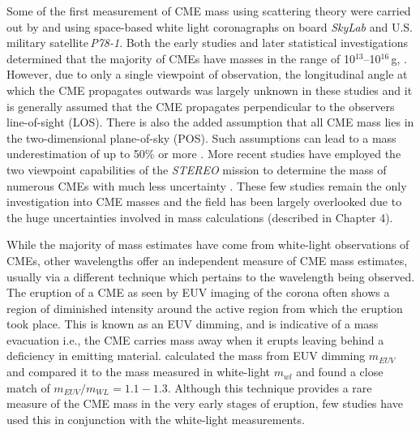 Some of the first measurement of CME mass using scattering theory were carried out by \citet{munro1979} and \citet{poland1981} using space-based  white light coronagraphs on board \emph{SkyLab} and U.S. military satellite\,\emph{P78-1}.  Both the early studies and later statistical investigations determined that the majority of CMEs have masses in the range of 10$^{13}$--10$^{16}$\,g, \citep{vourlidas02, vour2010}. However, due to only a single viewpoint of observation, the longitudinal angle at which the CME propagates outwards was largely unknown in these studies and it is generally assumed that the CME propagates perpendicular to the observers line-of-sight (LOS). There is also the added assumption that all CME mass lies in the two-dimensional plane-of-sky (POS). Such assumptions can lead to a mass underestimation of up to 50\% or more \citep{vou00}. More recent studies have employed the two viewpoint capabilities of the \emph{STEREO} mission to determine the mass of numerous CMEs with much less uncertainty \citep{cola09}. These few studies remain the only investigation into CME masses and the field has been largely overlooked due to the huge uncertainties involved in mass calculations (described in Chapter 4).

While the majority of mass estimates have come from white-light observations of CMEs, other wavelengths offer an independent measure of CME mass estimates, usually via a different technique which pertains to the wavelength being observed. The eruption of a CME as seen by EUV imaging of the corona often shows a region of diminished intensity around the active region from which the eruption took place. This is known as an EUV dimming, and is indicative of a mass evacuation i.e., the CME carries mass away when it erupts leaving behind a deficiency in emitting material.  
\citet{aschw09} calculated the mass from EUV dimming $m_{EUV}$ and compared it to the mass measured in white-light $m_{wl}$ and found a close match of $m_{EUV}/m_{WL}=1.1 -1.3$. Although this technique provides a rare measure of the CME mass in the very early stages of eruption, few studies have used this in conjunction with the white-light measurements.

